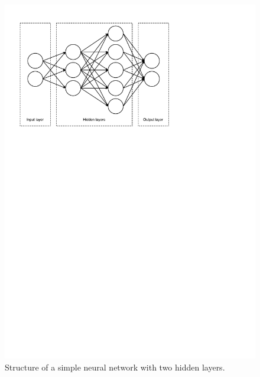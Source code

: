 \documentclass[12pt,a4paper,twoside,openright]{report}
\begin{document}
\begin{figure}[h]
	\centering
	\includegraphics[scale=0.6]{nn_layout}
	\caption{Structure of a simple neural network with two hidden layers.}
	\label{fig:nn_layout}
\end{figure}
\end{document}
